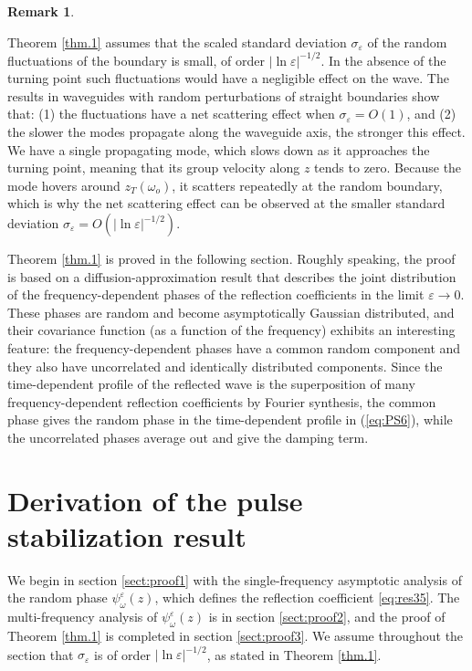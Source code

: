 \documentclass[final]{siamltex}
\newtheorem{remark}[theorem]{Remark}
\begin{document}
\begin{remark}
\end{remark}Theorem \ref{thm.1} assumes that the scaled standard
deviation $\sigma_{\varepsilon}$ of the random fluctuations of the boundary is
small, of order $|\ln {\varepsilon}|^{-1/2}$. In the absence of the turning
point such fluctuations would have a negligible effect on the
wave. The results \cite{alonso2011wave,gomez2011wave} in waveguides
with random perturbations of straight boundaries show that: (1) the
fluctuations have a net scattering effect when $\sigma_{\varepsilon} = O(1)$,
and (2) the slower the modes propagate along the waveguide axis, the
stronger this effect.  We have a single propagating mode, which slows
down as it approaches the turning point, meaning that its group
velocity along $z$ tends to zero. Because the mode hovers around
$z_T({\omega}_o)$, it scatters repeatedly at the random boundary, which is
why the net scattering effect can be observed at the smaller standard
deviation $\sigma_{\varepsilon} = O(|\ln {\varepsilon}|^{-1/2})$.

Theorem \ref{thm.1} is proved in the following section.
Roughly speaking,
the proof is based on a diffusion-approximation result that describes the joint
distribution of the frequency-dependent phases of the 
reflection coefficients in the limit ${\varepsilon} \to 0$.
These phases are random and become asymptotically Gaussian distributed,
and their covariance function (as a function of the frequency) exhibits an 
interesting feature: the frequency-dependent phases have a common random component
and they also have uncorrelated and identically distributed components.
Since the time-dependent profile of the reflected wave is the superposition of 
many frequency-dependent reflection coefficients by Fourier synthesis,
the common phase gives the random phase in the time-dependent profile
in (\ref{eq:PS6}), while the uncorrelated phases average out and give
 the damping term.

\section{Derivation of the pulse stabilization result}
\label{sect:proof}
We begin in section \ref{sect:proof1} with the single-frequency
asymptotic analysis of the random phase $\psi_{\omega}^{\varepsilon}(z)$, which
defines the reflection coefficient \eqref{eq:res35}. The
multi-frequency analysis of $\psi_{\omega}^{\varepsilon}(z)$ is in section
\ref{sect:proof2}, and the proof of Theorem \ref{thm.1} is completed
in section \ref{sect:proof3}. We assume throughout the section that 
$\sigma_{\varepsilon}$  is of order $|\ln {\varepsilon}|^{-1/2}$, as stated in
Theorem \ref{thm.1}.  
\end{document}
